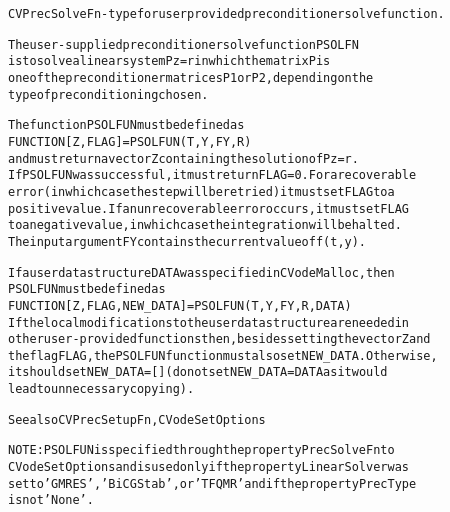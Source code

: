 \begin{alltt}
CVPrecSolveFn - type for user provided preconditioner solve function.

   The user-supplied preconditioner solve function PSOLFN
   is to solve a linear system P z = r in which the matrix P is
   one of the preconditioner matrices P1 or P2, depending on the
   type of preconditioning chosen.

   The function PSOLFUN must be defined as 
        FUNCTION [Z, FLAG] = PSOLFUN(T,Y,FY,R)
   and must return a vector Z containing the solution of Pz=r.
   If PSOLFUN was successful, it must return FLAG=0. For a recoverable 
   error (in which case the step will be retried) it must set FLAG to a 
   positive value. If an unrecoverable error occurs, it must set FLAG
   to a negative value, in which case the integration will be halted.
   The input argument FY contains the current value of f(t,y).

   If a user data structure DATA was specified in CVodeMalloc, then
   PSOLFUN must be defined as
        FUNCTION [Z, FLAG, NEW_DATA] = PSOLFUN(T,Y,FY,R,DATA)
   If the local modifications to the user data structure are needed in
   other user-provided functions then, besides setting the vector Z and
   the flag FLAG, the PSOLFUN function must also set NEW_DATA. Otherwise,
   it should set NEW_DATA=[] (do not set NEW_DATA = DATA as it would
   lead to unnecessary copying).

   See also CVPrecSetupFn, CVodeSetOptions

   NOTE: PSOLFUN is specified through the property PrecSolveFn to
   CVodeSetOptions and is used only if the property LinearSolver was
   set to 'GMRES', 'BiCGStab', or 'TFQMR' and if the property PrecType
   is not 'None'.
\end{alltt}






\vspace{0.1in}